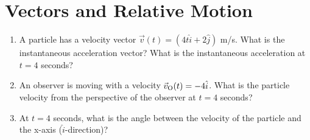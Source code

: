 \documentclass[10pt]{article}
\begin{document}
\section{Vectors and Relative Motion}
\begin{enumerate}
\item A particle has a velocity vector $\vec{v}(t) = (4t\hat{i}+2\hat{j})$ m/s.  What is the instantaneous acceleration vector?  What is the instantaneous acceleration at $t=4$ seconds? \vspace{2cm}
\item An observer is moving with a velocity $\vec{v}_{\rm O}(t) = -4\hat{i}$.  What is the particle velocity from the perspective of the observer at $t=4$ seconds? \vspace{2cm}
\item At $t=4$ seconds, what is the angle between the velocity of the particle and the x-axis ($\hat{i}$-direction)?
\end{enumerate}
\end{document}
